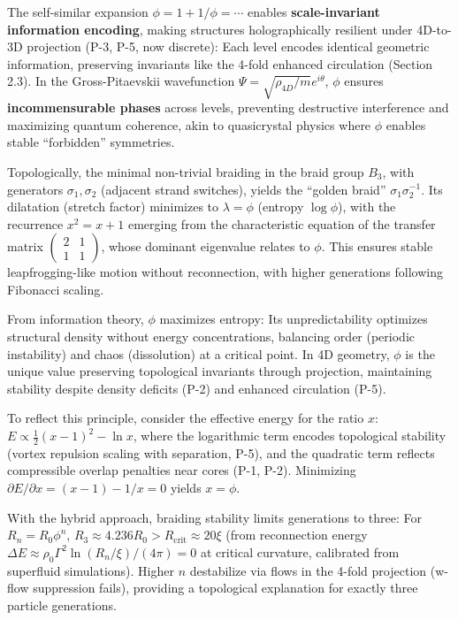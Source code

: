 The self-similar expansion $\phi = 1 + 1/\phi = \cdots$ enables \textbf{scale-invariant information encoding}, making structures holographically resilient under 4D-to-3D projection (P-3, P-5, now discrete): Each level encodes identical geometric information, preserving invariants like the 4-fold enhanced circulation (Section 2.3). In the Gross-Pitaevskii wavefunction $\Psi = \sqrt{\rho_{4D}/m} e^{i \theta}$, $\phi$ ensures \textbf{incommensurable phases} across levels, preventing destructive interference and maximizing quantum coherence, akin to quasicrystal physics where $\phi$ enables stable ``forbidden'' symmetries.

Topologically, the minimal non-trivial braiding in the braid group $B_3$, with generators $\sigma_1, \sigma_2$ (adjacent strand switches), yields the ``golden braid'' $\sigma_1 \sigma_2^{-1}$. Its dilatation (stretch factor) minimizes to $\lambda = \phi$ (entropy $\log \phi$), with the recurrence $x^2 = x + 1$ emerging from the characteristic equation of the transfer matrix $\begin{pmatrix} 2 & 1 \\ 1 & 1 \end{pmatrix}$, whose dominant eigenvalue relates to $\phi$. This ensures stable leapfrogging-like motion without reconnection, with higher generations following Fibonacci scaling.

From information theory, $\phi$ maximizes entropy: Its unpredictability optimizes structural density without energy concentrations, balancing order (periodic instability) and chaos (dissolution) at a critical point. In 4D geometry, $\phi$ is the unique value preserving topological invariants through projection, maintaining stability despite density deficits (P-2) and enhanced circulation (P-5).

To reflect this principle, consider the effective energy for the ratio $x$: $E \propto \frac{1}{2} (x - 1)^2 - \ln x$, where the logarithmic term encodes topological stability (vortex repulsion scaling with separation, P-5), and the quadratic term reflects compressible overlap penalties near cores (P-1, P-2). Minimizing $\partial E / \partial x = (x - 1) - 1/x = 0$ yields $x = \phi$.

With the hybrid approach, braiding stability limits generations to three: For $R_n = R_0 \phi^n$, $R_3 \approx 4.236 R_0 > R_{\text{crit}} \approx 20 \xi$ (from reconnection energy $\Delta E \approx \rho_0 \Gamma^2 \ln(R_n / \xi) / (4 \pi) = 0$ at critical curvature, calibrated from superfluid simulations). Higher $n$ destabilize via flows in the 4-fold projection (w-flow suppression fails), providing a topological explanation for exactly three particle generations.

